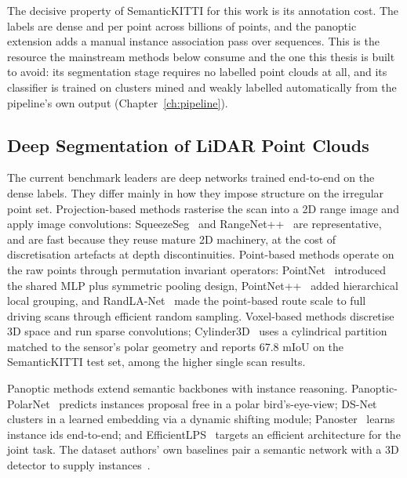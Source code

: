 \documentclass[a4paper,12pt]{report}
\begin{document}
The decisive property of SemanticKITTI for this work is its annotation cost.
The labels are dense and per point across billions of points, and the panoptic
extension adds a manual instance association pass over sequences. This is the resource
the mainstream methods below consume and the one this thesis is built to avoid: its
segmentation stage requires no labelled point clouds at all, and its classifier is
trained on clusters mined and weakly labelled automatically from the pipeline's own
output (Chapter~\ref{ch:pipeline}).

\subsection{Deep Segmentation of LiDAR Point Clouds}
\label{sec:bg-deep}

The current benchmark leaders are deep networks trained end-to-end on the dense labels.
They differ mainly in how they impose structure on the irregular point set.
Projection-based methods rasterise the scan into a 2D range image and apply
image convolutions: SqueezeSeg~\cite{10.1109/ICRA.2018.8462926} and
RangeNet++~\cite{milioto2019rangenet++} are representative, and are fast because they
reuse mature 2D machinery, at the cost of discretisation artefacts at depth
discontinuities. Point-based methods operate on the raw points through
permutation invariant operators: PointNet~\cite{Qi_2017_CVPR} introduced the
shared MLP plus symmetric pooling design, PointNet++~\cite{NIPS2017_d8bf84be} added
hierarchical local grouping, and RandLA-Net~\cite{Hu_2020_CVPR} made the point-based
route scale to full driving scans through efficient random sampling. Voxel-based
methods discretise 3D space and run sparse convolutions; Cylinder3D~\cite{zhu2021cylindrical}
uses a cylindrical partition matched to the sensor's polar geometry and reports
\num{67.8} mIoU on the SemanticKITTI test set, among the higher single scan results.

Panoptic methods extend semantic backbones with instance reasoning.
Panoptic-PolarNet~\cite{zhou2021panopticpolarnet} predicts instances proposal free in a
polar bird's-eye-view; DS-Net~\cite{hong2021dsnet} clusters in a learned embedding via a
dynamic shifting module; Panoster~\cite{gasperini2021panoster} learns instance ids
end-to-end; and EfficientLPS~\cite{sirohi2021efficientlps} targets an efficient
architecture for the joint task. The dataset authors' own baselines pair a semantic
network with a 3D detector to supply instances~\cite{behley2021panoptic}.
\end{document}

